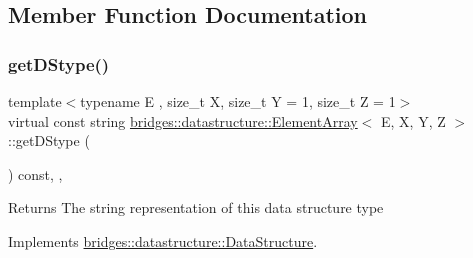 \subsection{Member Function Documentation}
\mbox{\label{classbridges_1_1datastructure_1_1_element_array_a22d8c37e88616105cdb7c755f99fdb20}} 
\subsubsection{\texorpdfstring{get\+D\+Stype()}{getDStype()}}
{\footnotesize\ttfamily template$<$typename E , size\+\_\+t X, size\+\_\+t Y = 1, size\+\_\+t Z = 1$>$ \\
virtual const string \hyperlink{classbridges_1_1datastructure_1_1_element_array}{bridges\+::datastructure\+::\+Element\+Array}$<$ E, X, Y, Z $>$\+::get\+D\+Stype (\begin{DoxyParamCaption}{ }\end{DoxyParamCaption}) const\hspace{0.3cm}{\ttfamily [inline]}, {\ttfamily [override]}, {\ttfamily [virtual]}}

\begin{DoxyReturn}{Returns}
The string representation of this data structure type 
\end{DoxyReturn}


Implements \hyperlink{classbridges_1_1datastructure_1_1_data_structure_a4ff66cb34409f11fe9fc647f6d8a22ce}{bridges\+::datastructure\+::\+Data\+Structure}.

\mbox{\label{classbridges_1_1datastructure_1_1_element_array_a383d08e16eeeb06217d030ed2b18fb37}} 
